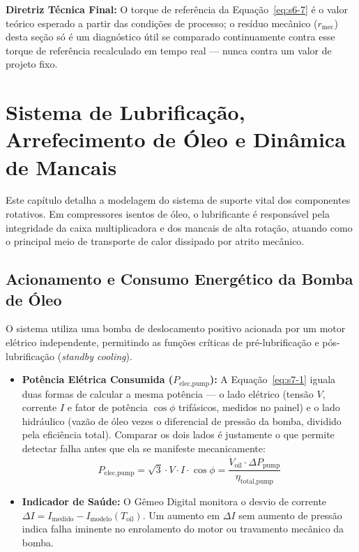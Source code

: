 \documentclass[12pt,a4paper]{article}
\numberwithin{equation}{section}
\numberwithin{table}{section}
\numberwithin{figure}{section}
\begin{document}
	\textbf{Diretriz Técnica Final:} O torque de referência da Equação~\eqref{eq:s6-7} é o valor teórico esperado a partir das condições de processo; o resíduo mecânico ($r_{\text{mec}}$) desta seção só é um diagnóstico útil se comparado continuamente contra esse torque de referência recalculado em tempo real — nunca contra um valor de projeto fixo.

	
	
	\section{\textbf{Sistema de Lubrificação, Arrefecimento de Óleo e Dinâmica de Mancais}}
	
	Este capítulo detalha a modelagem do sistema de suporte vital dos componentes rotativos. Em compressores isentos de óleo, o lubrificante é responsável pela integridade da caixa multiplicadora e dos mancais de alta rotação, atuando como o principal meio de transporte de calor dissipado por atrito mecânico.
	
	\subsection{\textbf{Acionamento e Consumo Energético da Bomba de Óleo}}
	O sistema utiliza uma bomba de deslocamento positivo acionada por um motor elétrico independente, permitindo as funções críticas de pré-lubrificação e pós-lubrificação (\textit{standby cooling}).
	\begin{itemize}
		\item \textbf{Potência Elétrica Consumida ($P_{\text{elec,pump}}$):} A Equação~\eqref{eq:s7-1} iguala duas formas de calcular a mesma potência — o lado elétrico (tensão $V$, corrente $I$ e fator de potência $\cos\phi$ trifásicos, medidos no painel) e o lado hidráulico (vazão de óleo vezes o diferencial de pressão da bomba, dividido pela eficiência total). Comparar os dois lados é justamente o que permite detectar falha antes que ela se manifeste mecanicamente:
		\begin{equation}\label{eq:s7-1}
 P_{\text{elec,pump}} = \sqrt{3} \cdot V \cdot I \cdot \cos \phi = \frac{\dot{V}_{\text{oil}} \cdot \Delta P_{\text{pump}}}{\eta_{\text{total,pump}}}
\end{equation}
		\item \textbf{Indicador de Saúde:} O Gêmeo Digital monitora o desvio de corrente $\Delta I = I_{\text{medido}} - I_{\text{modelo}}(T_{\text{oil}})$. Um aumento em $\Delta I$ sem aumento de pressão indica falha iminente no enrolamento do motor ou travamento mecânico da bomba.
	\end{itemize}
	
\end{document}
